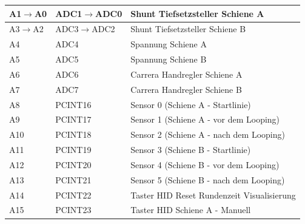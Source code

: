 \documentclass[a4paper, 11pt]{report}
\begin{document}
\begin{table}[hb]
\begin{tabular}{|l|l|l|}
			\hline
			A1$\rightarrow$A0 & ADC1$\rightarrow$ADC0 & Shunt Tiefsetzsteller Schiene A\\
			\hline
			A3$\rightarrow$A2 & ADC3$\rightarrow$ADC2 & Shunt Tiefsetzsteller Schiene B\\
			\hline
			A4 & ADC4 & Spannung Schiene A\\
			\hline
			A5 & ADC5 & Spannung Schiene B\\
			\hline
			A6 & ADC6 & Carrera Handregler Schiene A\\
			\hline
			A7 & ADC7 & Carrera Handregler Schiene B\\
			\hline
			A8 & PCINT16 & Sensor 0 (Schiene A - Startlinie)\\
			\hline
			A9 & PCINT17 & Sensor 1 (Schiene A - vor dem Looping)\\
			\hline
			A10 & PCINT18 & Sensor 2 (Schiene A - nach dem Looping)\\
			\hline
			A11 & PCINT19 & Sensor 3 (Schiene B - Startlinie)\\
			\hline
			A12 & PCINT20 & Sensor 4 (Schiene B - vor dem Looping)\\
			\hline
			A13 & PCINT21 & Sensor 5 (Schiene B - nach dem Looping)\\
			\hline
			A14 & PCINT22 & Taster HID \glqq Reset Rundenzeit Visualisierung\grqq \\
			\hline
			A15 & PCINT23 & Taster HID \glqq Schiene A - Manuell\grqq \\
			\hline
		\end{tabular}
		
		\label{tab:AnhangBelegungArduino}
	\end{table}

	\clearpage
	
\end{document}

